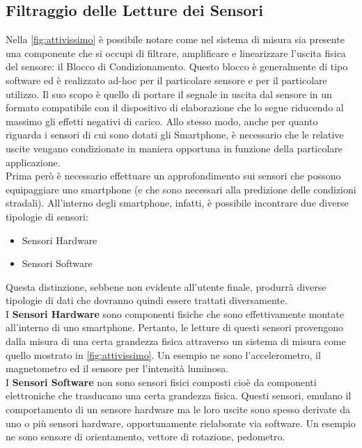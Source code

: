 \subsection{Filtraggio delle Letture dei Sensori}
\label{subsec:filtering_sensor}
Nella \autoref{fig:attivissimo} è possibile notare come nel sistema di misura sia presente una componente che si occupi di filtrare, amplificare e linearizzare l'uscita fisica del sensore: il Blocco di Condizionamento. Questo blocco è generalmente di tipo software ed è realizzato ad-hoc per il particolare sensore e per il particolare utilizzo. Il suo scopo è quello di portare il segnale in uscita dal sensore in un formato compatibile con il dispositivo di elaborazione che lo segue riducendo al massimo gli effetti negativi di carico. \cite{book:slide_Attivissimo} Allo stesso modo, anche per quanto riguarda i sensori di cui sono dotati gli Smartphone, è necessario che le relative uscite vengano condizionate in maniera opportuna in funzione della particolare applicazione.\\
Prima però è necessario effettuare un approfondimento sui sensori che possono equipaggiare uno smartphone (e che sono necessari alla predizione delle condizioni stradali). All'interno degli smartphone, infatti, è possibile incontrare due diverse tipologie di sensori:
\begin{itemize}
	\item Sensori Hardware
	\item Sensori Software
\end{itemize}
Questa distinzione, sebbene non evidente all'utente finale, produrrà diverse tipologie di dati che dovranno quindi essere trattati diversamente.\\
I \textbf{Sensori Hardware} sono componenti fisiche che sono effettivamente montate all'interno di uno smartphone. Pertanto, le letture di questi sensori provengono dalla misura di una certa grandezza fisica attraverso un sistema di misura come quello mostrato in \autoref{fig:attivissimo}. Un esempio ne sono l'accelerometro, il magnetometro ed il sensore per l'intensità luminosa.\\
I \textbf{Sensori Software} non sono sensori fisici composti cioè da componenti elettroniche che trasducano una certa grandezza fisica. Questi sensori, emulano il comportamento di un sensore hardware ma le loro uscite sono spesso derivate da uno o più sensori hardware, opportunamente rielaborate via software. Un esempio ne sono sensore di orientamento, vettore di rotazione, pedometro.\\
